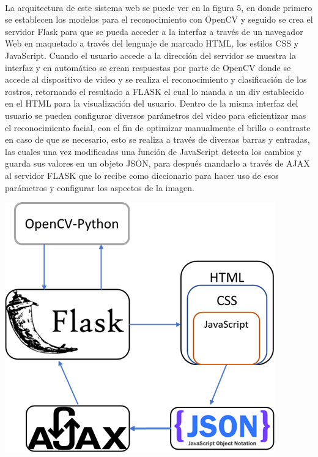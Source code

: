\documentclass[9pt]{report}
\newenvironment{Figura}
  {\par\medskip\noindent\minipage{\linewidth}}
  {\endminipage\par\medskip}
\begin{document}
\begin{multicols}{2}
	\paragraph{}
	La arquitectura de este sistema web se puede ver en la figura 5, en donde primero se establecen los modelos para el reconocimiento con OpenCV y seguido se crea el servidor Flask para que se pueda acceder a la interfaz a través de un navegador Web en maquetado a través del lenguaje de marcado HTML, los estilos CSS y JavaScript. Cuando el usuario accede a la dirección del servidor se muestra la interfaz y en automático se crean respuestas por parte de OpenCV donde se accede al dispositivo de video y se realiza el reconocimiento y clasificación de los rostros, retornando el resultado a FLASK el cual lo manda a un div establecido en el HTML para la visualización del usuario. Dentro de la misma interfaz del usuario se pueden configurar diversos parámetros del video para eficientizar mas el reconocimiento facial, con el fin de optimizar manualmente el brillo o contraste en caso de que se necesario, esto se realiza a través de diversas barras y entradas, las cuales una vez modificadas una función de JavaScript detecta los cambios y guarda sus valores en un objeto JSON, para después mandarlo a través de AJAX al servidor FLASK que lo recibe como diccionario para hacer uso de esos parámetros y configurar los aspectos de la imagen.
	\begin{Figura}
		\includegraphics[width=\textwidth]{4}
		\label{figura5}
	\end{Figura}

\end{multicols}
\end{document}
